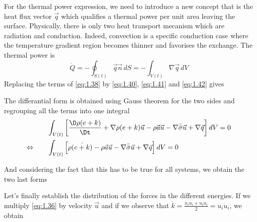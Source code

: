 		For the thermal power expression, we need to introduce a new concept that is the heat flux vector $\vec{q}$ which qualifies a thermal power per unit area leaving the surface. Physically, there is only two heat transport mecanism which are radiation and conduction. Indeed, convection is a specific conduction case where the temperature gradient region becomes thinner and favorises the exchange. The thermal power is 
		\begin{equation}
			\dot{Q} =  - \oint _{S(t)} \vec{q} \vec{n} \, dS = - \int _{V(t)} \nabla \vec{q} \, dV
			\label{eq:1.42}
		\end{equation}
		Replacing the terms of \eqref{eq:1.38} by \eqref{eq:1.40}, \eqref{eq:1.41} and \eqref{eq:1.42} gives 
		\begin{center}
		\end{center}
		
		The differantial form is obtained using Gauss theorem for the two sides and regrouping all the terms into one integral
		\begin{equation}
		\begin{aligned}
			&\int _{V(t)} \left[\frac{\D\rho (e+k)}{\Dt} + \nabla \rho (e+k)\vec{u} - \rho \vec{a} \vec{u} - \nabla \bar{\bar{\sigma}}\vec{u} + \nabla \vec{q} \right] dV = 0 \\
			\Leftrightarrow \qquad &\int _{V(t)} \left[\rho\dot{(e+k)} - \rho \vec{a} \vec{u} - \nabla \bar{\bar{\sigma}}\vec{u} + \nabla \vec{q} \right] dV = 0
		\end{aligned}
		\end{equation}
		
		And considering the fact that this has to be true for all systems, we obtain the two last forms
		\begin{center}
		\end{center}
		\begin{center}
		\end{center}
		Let's finally establish the distribution of the forces in the different energies. If we multiply \eqref{eq:1.36} by velocity $\vec{u}$ and if we observe that $\dot{k} = \frac{\dot{u}_i u_i+u_i\dot{u}_i}{2} = u_i \dot{u}_i$, we obtain 
		

